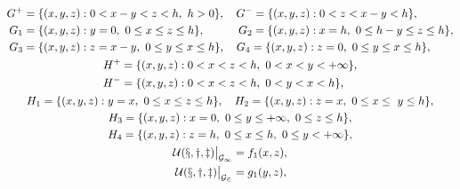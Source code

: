 \begin{gather}


\begin{align*}


G^+&=\{(x,y,z):0<x-y<z<h,\ h>0\},\quad 


G^-=\{(x,y,z):0<z<x-y<h\},




\\ 


G_1&=\{(x,y,z):y=0,\ 0\le x\le z\le h\},\quad\qquad 


G_2=\{(x,y,z):x=h,\ 0\le h-y\le z\le h\},




\\ 


G_3&=\{(x,y,z):z=x-y,\ 0\le y\le x\le h\},\quad 


G_4=\{(x,y,z):z=0,\ 0\le y\le x\le h\},




\end{align*}


\\


% 


\begin{align*}


H^+&=\{(x,y,z):0<x<z<h,\ 0<x<y<+\infty\},




\\


H^-&=\{(x,y,z):0<x<z<h,\ 0<y<x<h\},




\end{align*}


\\


H_1=\{(x,y,z):y=x,\ 0\le x\le z\le h\},\quad 


H_2=\{(x,y,z):z=x,\ 0\le x\le\ y\le h\},\notag \\ 


H_3=\{(x,y,z):x=0,\ 0\le y\le+\infty,\ 0\le z\le h\},\notag \\


H_4=\{(x,y,z):z=h,\ 0\le x\le h,\ 0\le y<+\infty\}, \notag \\


\begin{align} 


\cal U(x,y,z)\big|_{G_1}&=f_1(x,z), \\ 


\cal U(x,y,z)\big|_{G_2}&=g_1(y,z), \\ 



\end{align}
\end{gather}
